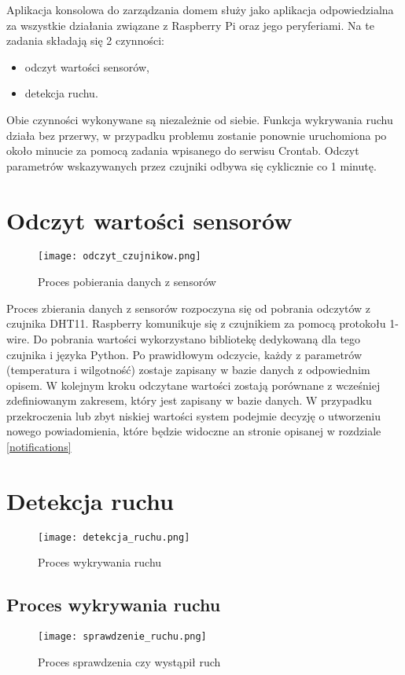 Aplikacja konsolowa do zarządzania domem służy jako aplikacja odpowiedzialna za wszystkie działania związane z Raspberry Pi oraz jego peryferiami. Na te zadania składają się 2 czynności:
\begin{itemize}
\item odczyt wartości sensorów,
\item detekcja ruchu.
\end{itemize}
Obie czynności wykonywane są niezależnie od siebie. Funkcja wykrywania ruchu działa bez przerwy, w przypadku problemu zostanie ponownie uruchomiona po około minucie za pomocą zadania wpisanego do serwisu Crontab. Odczyt parametrów wskazywanych przez czujniki odbywa się cyklicznie co 1 minutę.

\section{Odczyt wartości sensorów}
\begin{figure}[H]
	\centering
	\texttt{[image: odczyt\_czujnikow.png]}
	\caption{Proces pobierania danych z sensorów}
	\label{fig:wykrywanie_proces}
\end{figure}
Proces zbierania danych z sensorów rozpoczyna się od pobrania odczytów z czujnika DHT11. Raspberry komunikuje się z czujnikiem za pomocą protokołu 1-wire. Do pobrania wartości wykorzystano bibliotekę dedykowaną dla tego czujnika i języka Python. Po prawidłowym odczycie, każdy z parametrów (temperatura i wilgotność) zostaje zapisany w bazie danych z odpowiednim opisem. W kolejnym kroku odczytane wartości zostają porównane z wcześniej zdefiniowanym zakresem, który jest zapisany w bazie danych. W przypadku przekroczenia lub zbyt niskiej wartości system podejmie decyzję o utworzeniu nowego powiadomienia, które będzie widoczne an stronie opisanej w rozdziale \ref{notifications}

\section{Detekcja ruchu}
\begin{figure}[H]
	\centering
	\texttt{[image: detekcja\_ruchu.png]}
	\caption{Proces wykrywania ruchu}
	\label{fig:wykrywanie_proces}
\end{figure}

\subsection{Proces wykrywania ruchu}
\begin{figure}[H]
	\centering
	\texttt{[image: sprawdzenie\_ruchu.png]}
	\caption{Proces sprawdzenia czy wystąpił ruch}
	\label{fig:wykrywanie_proces}
\end{figure}